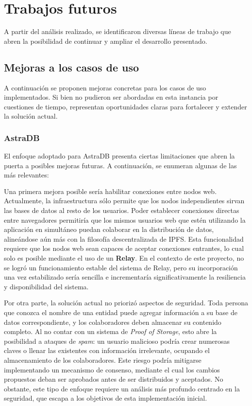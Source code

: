 \section{Trabajos futuros}

A partir del análisis realizado, se identificaron diversas líneas de trabajo que abren la posibilidad de continuar y ampliar el desarrollo presentado.

\subsection{Mejoras a los casos de uso}

A continuación se proponen mejoras concretas para los casos de uso implementados. Si bien no pudieron ser abordadas en esta instancia por cuestiones de tiempo, representan oportunidades claras para fortalecer y extender la solución actual.

\subsubsection{AstraDB}

El enfoque adoptado para AstraDB presenta ciertas limitaciones que abren la puerta a posibles mejoras futuras. A continuación, se enumeran algunas de las más relevantes:

Una primera mejora posible sería habilitar conexiones entre nodos web. Actualmente, la infraestructura sólo permite que los nodos independientes sirvan las bases de datos al resto de los usuarios. Poder establecer conexiones directas entre navegadores permitiría que los mismos usuarios web que estén utilizando la aplicación en simultáneo puedan colaborar en la distribución de datos, alineándose aún más con la filosofía descentralizada de IPFS. Esta funcionalidad requiere que los nodos web sean capaces de aceptar conexiones entrantes, lo cual solo es posible mediante el uso de un \textbf{Relay}. En el contexto de este proyecto, no se logró un funcionamiento estable del sistema de Relay, pero su incorporación una vez estabilizado sería sencilla e incrementaría significativamente la resiliencia y disponibilidad del sistema.

Por otra parte, la solución actual no priorizó aspectos de seguridad. Toda persona que conozca el nombre de una entidad puede agregar información a su base de datos correspondiente, y los colaboradores deben almacenar su contenido completo. Al no contar con un sistema de \textit{Proof of Storage}, esto abre la posibilidad a ataques de \textit{spam}: un usuario malicioso podría crear numerosas claves o llenar las existentes con información irrelevante, ocupando el almacenamiento de los colaboradores. Este riesgo podría mitigarse implementando un mecanismo de consenso, mediante el cual los cambios propuestos deban ser aprobados antes de ser distribuidos y aceptados. No obstante, este tipo de enfoque requiere un análisis más profundo centrado en la seguridad, que escapa a los objetivos de esta implementación inicial.

